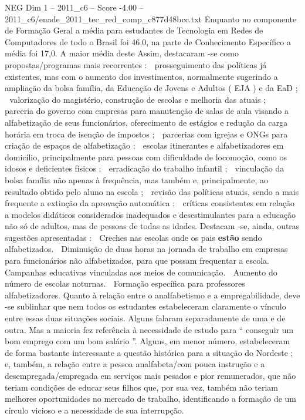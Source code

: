 \begin{textsample}{NEG Dim 1 – 2011\_c6 – Score -4.00 – 2011\_c6/enade\_2011\_tec\_red\_comp\_c877d48bcc.txt}
Enquanto no componente de Formação Geral a média para estudantes de Tecnologia em Redes de Computadores de todo o Brasil foi 46,0, na parte de Conhecimento Específico a média foi 17,0.
A maior média deste Assim, destacaram -se como propostas/programas mais recorrentes :  prosseguimento das políticas já existentes, mas com o aumento dos investimentos, normalmente sugerindo a ampliação da bolsa família, da Educação de Jovens e Adultos ( EJA ) e da EaD ;  valorização do magistério, construção de escolas e melhoria das atuais ;  parceria do governo com empresas para manutenção de salas de aula visando a alfabetização de seus funcionários, oferecimento de estágios e redução da carga horária em troca de isenção de impostos ;  parcerias com igrejas e ONGs para criação de espaços de alfabetização ;  escolas itinerantes e alfabetizadores em domicílio, principalmente para pessoas com dificuldade de locomoção, como os idosos e deficientes físicos ;  erradicação do trabalho infantil ;  vinculação da bolsa família não apenas à frequência, mas também e, principalmente, ao resultado obtido pelo aluno na escola ;  revisão das políticas atuais, sendo a mais frequente a extinção da aprovação automática ;  críticas consistentes em relação a modelos didáticos considerados inadequados e desestimulantes para a educação não só de adultos, mas de pessoas de todas as idades.
Destacam -se, ainda, outras sugestões apresentadas :  Creches nas escolas onde os pais \textbf{estão} sendo alfabetizados.  Diminuição de duas horas na jornada de trabalho em empresas para funcionários não alfabetizados, para que possam frequentar a escola.  Campanhas educativas vinculadas aos meios de comunicação.  Aumento do número de escolas noturnas.  Formação específica para professores alfabetizadores.
Quanto à relação entre o analfabetismo e a empregabilidade, deve -se sublinhar que nem todos os estudantes estabeleceram claramente o vínculo entre essas duas situações sociais.
Alguns falaram separadamente de uma e de outra.
Mas a maioria fez referência à necessidade de estudo para “ conseguir um bom emprego com um bom salário ”.
Alguns, em menor número, estabeleceram de forma bastante interessante a questão histórica para a situação do Nordeste ; e, também, a relação entre a pessoa analfabeta/com pouca instrução e a desempregada/empregada em serviços mais pesados e pior remunerados, que não teriam condições de educar seus filhos que, por sua vez, também não teriam melhores oportunidades no mercado de trabalho, identificando a formação de um círculo vicioso e a necessidade de sua interrupção.

\end{textsample}
